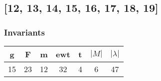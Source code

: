 \documentclass[a4paper]{article}
\begin{document}
\newpage\subsection{[12, 13, 14, 15, 16, 17, 18, 19]}
\noindent\begin{minipage}{0.6\textwidth}
\subsubsection*{Invariants}
\centering
\begin{tabular}{|c|c|c|c|c|c|c|}
\toprule
g & F & m & ewt & t & \(|M|\) & \(|\lambda|\) \\
\midrule
15 & 23 & 12 & 32 & 4 & 6 & 47 \\
\bottomrule
\end{tabular}
\end{minipage}%
\end{document}
